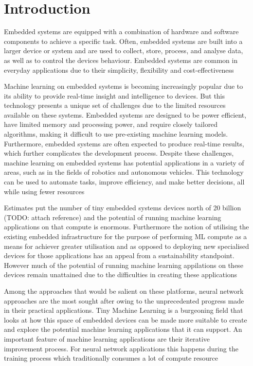 \part{Introduction}

Embedded systems are equipped with a combination of hardware and software components to achieve a specific task. Often, embedded systems are built into a larger device or system and are used to collect, store, process, and analyse data, as well as to control the device\textquotesingle s behaviour. Embedded systems are common in everyday applications due to their simplicity, flexibility and cost-effectiveness

Machine learning on embedded systems is becoming increasingly popular due to its ability to provide real-time insight and intelligence to devices. But this technology presents a unique set of challenges due to the limited resources available on these systems. Embedded systems are designed to be power efficient, have limited memory and processing power, and require closely tailored algorithms, making it difficult to use pre-existing machine learning models. Furthermore, embedded systems are often expected to produce real-time results, which further complicates the development process. Despite these challenges, machine learning on embedded systems has potential applications in a variety of areas, such as in the fields of robotics and autonomous vehicles. This technology can be used to automate tasks, improve efficiency, and make better decisions, all while using fewer resources

Estimates put the number of tiny embedded systems devices north of 20 billion (TODO: attach reference) and the potential of running machine learning applications on that compute is enormous. Furthermore the notion of utilising the existing embedded infrastructure for the purpose of performing ML compute as a means for achiever greater utilisation and as opposed to deploying new specialised devices for those applications has an appeal from a sustainability standpoint. However much of the potential of running machine learning appilations on these devices remain unattained due to the difficulties in creating these applications

Among the approaches that would be salient on these platforms, neural network approaches are the most sought after owing to the unprecedented progress made in their practical applications. Tiny Machine Learning is a burgeoning field that looks at how this space of embedded devices can be made more suitable to create and explore the potential machine learning applications that it can support. An important feature of machine learning applications are their iterative improvement process. For neural network applications this happens during the training process which traditionally consumes a lot of compute resource


